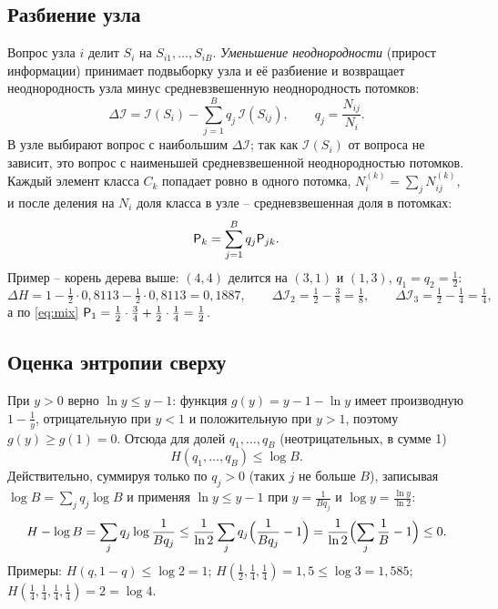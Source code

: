 \documentclass[12pt,a4paper]{article}
\begin{document}
\subsection{Разбиение узла}

Вопрос узла $i$ делит $S_i$ на $S_{i1}, \dots, S_{iB}$. \emph{Уменьшение
неоднородности} (прирост информации) принимает подвыборку узла и её разбиение и
возвращает неоднородность узла минус средневзвешенную неоднородность потомков:
\begin{equation}\label{eq:gain}
  \Delta\mathcal{I} = \mathcal{I}(S_i) - \sum_{j=1}^{B} q_j\,\mathcal{I}(S_{ij}),
  \qquad
  q_j = \frac{N_{ij}}{N_i} .
\end{equation}
В узле выбирают вопрос с наибольшим $\Delta\mathcal{I}$; так как $\mathcal{I}(S_i)$ от
вопроса не зависит, это вопрос с наименьшей средневзвешенной неоднородностью
потомков. Каждый элемент класса $C_k$
попадает ровно в одного потомка, $N_i^{(k)} = \sum_j N_{ij}^{(k)}$, и после деления
на $N_i$ доля класса в узле -- средневзвешенная доля в потомках:
\begin{equation}\label{eq:mix}
  \mathsf{P}_k = \sum_{j=1}^{B} q_j\mathsf{P}_{jk} .
\end{equation}
Пример -- корень дерева выше: $(4, 4)$ делится на $(3, 1)$ и $(1, 3)$,
$q_1 = q_2 = \frac12$:
\[
  \Delta H = 1 - \tfrac12 \cdot 0{,}8113 - \tfrac12 \cdot 0{,}8113 = 0{,}1887,
  \qquad
  \Delta\mathcal{I}_2 = \tfrac12 - \tfrac38 = \tfrac18,
  \qquad
  \Delta\mathcal{I}_3 = \tfrac12 - \tfrac14 = \tfrac14,
\]
а по \eqref{eq:mix} $\mathsf{P}_1 = \frac12 \cdot \frac34 + \frac12 \cdot \frac14 = \frac12$.

\subsection{Оценка энтропии сверху}

При $y > 0$ верно $\ln y \le y - 1$: функция $g(y) = y - 1 - \ln y$ имеет
производную $1 - \frac1y$, отрицательную при $y < 1$ и положительную при $y > 1$,
поэтому $g(y) \ge g(1) = 0$. Отсюда для долей $q_1, \dots, q_B$ (неотрицательных, в
сумме 1)
\begin{equation}\label{eq:logB}
  H(q_1, \dots, q_B) \le \log B .
\end{equation}
Действительно, суммируя только по $q_j > 0$ (таких $j$ не больше $B$), записывая
$\log B = \sum_j q_j\log B$ и применяя $\ln y \le y - 1$ при $y = \frac{1}{Bq_j}$ и
$\log y = \frac{\ln y}{\ln 2}$:
\[
  H - \log B = \sum_j q_j\log\frac{1}{Bq_j}
  \le \frac{1}{\ln 2}\sum_j q_j\Bigl(\frac{1}{Bq_j} - 1\Bigr)
  = \frac{1}{\ln 2}\Bigl(\sum_j \frac1B - 1\Bigr) \le 0 .
\]
Примеры: $H(q, 1 - q) \le \log 2 = 1$;
$H(\frac12, \frac14, \frac14) = 1{,}5 \le \log 3 = 1{,}585$;
$H(\frac14, \frac14, \frac14, \frac14) = 2 = \log 4$.
\end{document}
